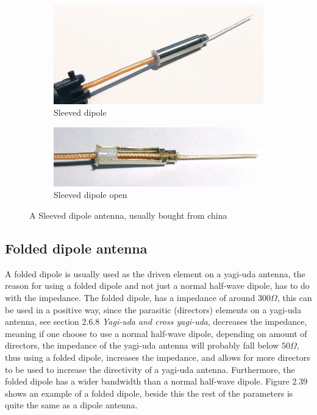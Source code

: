 \begin{figure}[h!]
  \centering
  \begin{subfigure}[b]{0.65\linewidth}
    \includegraphics[width=\linewidth]{figures/SleeveDipole.jpg}   
    \caption{Sleeved dipole}
    \end{subfigure}
  \begin{subfigure}[b]{0.65\linewidth}
    \includegraphics[width=\linewidth]{figures/SleeveDipoleOpen.jpg}
    \caption{Sleeved dipole open}
  \end{subfigure}
  \caption{A Sleeved dipole antenna, usually bought from china}
\end{figure}

\subsection{Folded dipole antenna}
A folded dipole is usually used as the driven element on a yagi-uda antenna, the reason for using a folded dipole and not just a normal half-wave dipole, has to do with the impedance. The folded dipole, has a impedance of around $300\Omega$, this can be used in a positive way, since the parasitic (directors) elements on a yagi-uda antenna, see section 2.6.8 \textit{Yagi-uda and cross yagi-uda}, decreases the impedance, meaning if one choose to use a normal half-wave dipole, depending on amount of directors, the impedance of the yagi-uda antenna will probably fall below $50\Omega$, thus using a folded dipole, increases the impedance, and allows for more directors to be used to increase the directivity of a yagi-uda antenna. Furthermore, the folded dipole has a wider bandwidth than a normal half-wave dipole. Figure 2.39 shows an example of a folded dipole, beside this the rest of the parameters is quite the same as a dipole antenna. 

